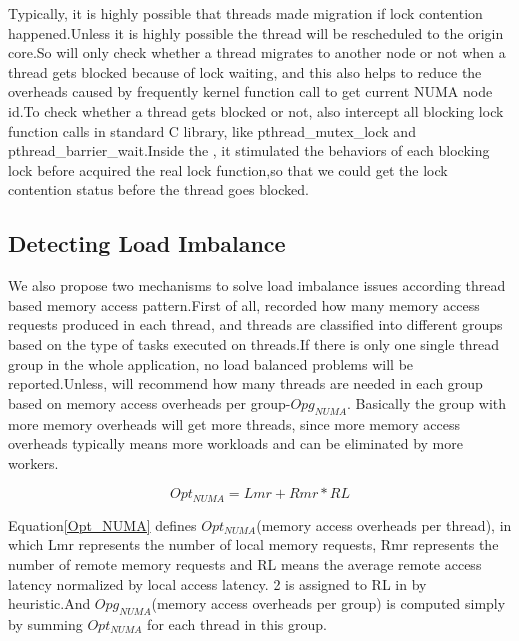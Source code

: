 Typically, it is highly possible that threads made migration if lock contention happened.Unless it is highly possible the thread will be rescheduled to the origin core.So \NP{} will only check whether a thread migrates to another node or not when a thread gets blocked because of lock waiting, and this also helps to reduce the overheads caused by frequently kernel function call to get current NUMA node id.To check whether a thread gets blocked or not, \NP{} also intercept all blocking lock function calls in standard C library, like pthread\_mutex\_lock and pthread\_barrier\_wait.Inside the \NP{}, it stimulated the behaviors of each blocking lock before acquired the real lock function,so that we could get the lock contention status before the thread goes blocked.

\subsection{Detecting Load Imbalance}
We also propose two mechanisms to solve load imbalance issues according thread based memory access pattern.First of all, \NP{} recorded how many memory access requests produced in each thread, and threads are classified into different groups based on the type of tasks executed on threads.If there is only one single thread group in the whole application, no load balanced problems will be reported.Unless, \NP{} will recommend how many threads are needed in each group based on memory access overheads per group-$Opg_{NUMA}$. Basically the group with more memory overheads will get more threads, since more memory access overheads typically means more workloads and can be eliminated by more workers.

\begin{equation}
Opt_{NUMA} = Lmr + Rmr * RL  \label{Opt_NUMA}
\end{equation}

Equation\ref{Opt_NUMA} defines $Opt_{NUMA}$(memory access overheads per thread), in which Lmr represents the number of local memory requests, Rmr represents the number of remote memory requests and RL means the average remote access latency normalized by local access latency. 2 is assigned to RL in \NP{} by heuristic.And $Opg_{NUMA}$(memory access overheads per group) is computed simply by summing $Opt_{NUMA}$ for each thread in this group.


